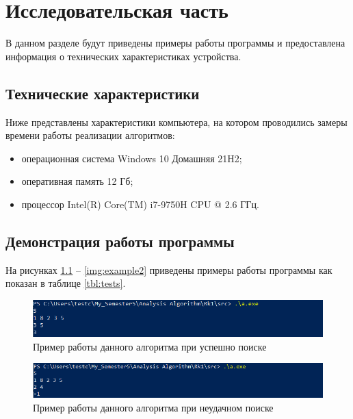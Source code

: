 \chapter{Исследовательская часть}

В данном разделе будут приведены примеры работы программы и предоставлена информация о технических характеристиках устройства.

\section{Технические характеристики}

Ниже представлены характеристики компьютера, на котором проводились замеры времени работы реализации алгоритмов:

\begin{itemize}
	\item операционная система Windows 10 Домашняя 21H2;
	\item оперативная память 12 Гб;
	\item процессор Intel(R) Core(TM) i7-9750H CPU @ 2.6 ГГц.
\end{itemize}

\clearpage

\section{Демонстрация работы программы}

На рисунках \ref{img:example} -- \ref{img:example2} приведены примеры работы программы как показан в таблице \ref{tbl:tests}.

\begin{figure}[h]
	\begin{center}
		\includegraphics[scale=0.7]{img/example.png}
	\end{center}
	\captionsetup{justification=centering}
	\caption{Пример работы данного алгоритма при успешно поиске}
	\label{img:example}
\end{figure}


\begin{figure}[h]
	\begin{center}
		\includegraphics[scale=0.7]{img/example1.png}
	\end{center}
	\captionsetup{justification=centering}
	\caption{Пример работы данного алгоритма при неудачном поиске}
	\label{img:example1}
\end{figure}
\clearpage

